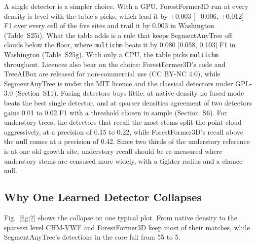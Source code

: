 \documentclass[journal]{IEEEtran}
\begin{document}
A single detector is a simpler choice. With a GPU, ForestFormer3D run at every
density is level with the table's picks, which lead it by +0.003 [$-$0.006,
+0.012] F1 over every cell of the five sites and trail it by 0.003 in Washington
(Table~S25i). What the table adds is a rule that keeps SegmentAnyTree off clouds
below the floor, where \texttt{multichm} beats it by 0.080 [0.058, 0.103] F1 in
Washington (Table~S25g). With only a CPU, the table picks \texttt{multichm}
throughout. Licences also bear on the choice: ForestFormer3D's
code and TreeAIBox are released for non-commercial use (CC BY-NC 4.0), while
SegmentAnyTree is under the MIT licence and the classical detectors under
GPL-3.0 (Section~S11). Fusing detectors buys little: at native density no
fused mode beats the best single detector, and at sparser densities agreement of
two detectors gains 0.01 to 0.02 F1 with a threshold chosen in sample (Section~S6). For understory trees, the detectors that recall the most stems split the
point cloud aggressively, at a precision of 0.15 to 0.22, while ForestFormer3D's
recall above the null comes at a precision of 0.42. Since two thirds of the
understory reference is at one old-growth site, understory recall should be
re-measured where understory stems are censused more widely, with a tighter
radius and a chance null.

\subsection{Why One Learned Detector Collapses}\label{sec:6.2}

Fig.~\ref{fig:7} shows the collapse on one typical plot. From native density to the
sparsest level CHM-VWF and ForestFormer3D keep most of their matches, while
SegmentAnyTree's detections in the core fall from 55 to 5.
\end{document}
